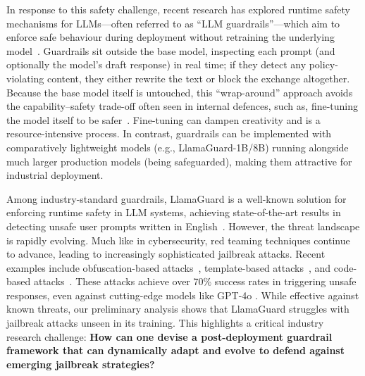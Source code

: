In response to this safety challenge, recent research has explored runtime safety mechanisms for LLMs—often referred to as ``LLM guardrails''—which aim to enforce safe behaviour during deployment without retraining the underlying model~\cite{inan2023llama,lees2022new,markov2023holistic,alon2023detecting}.
Guardrails sit outside the base model, inspecting each prompt (and optionally the model's draft response) in real time; if they detect any policy-violating content, they either rewrite the text or block the exchange altogether. Because the base model itself is untouched, this ``wrap-around'' approach avoids the capability–safety trade-off often seen in internal defences, such as, fine-tuning the model itself to be safer~\cite{zhao2025improving,du2025advancing,alami2024alignment,ge2023mart}. Fine-tuning can dampen creativity and is a resource-intensive process. In contrast, guardrails can be implemented with comparatively lightweight models (e.g., LlamaGuard-1B/8B) running alongside much larger production models (being safeguarded), making them attractive for industrial deployment.


Among industry-standard guardrails, LlamaGuard is a well-known solution for enforcing runtime safety in LLM systems, achieving state-of-the-art results in detecting unsafe user prompts written in English~\cite{inan2023llama}. However, the threat landscape is rapidly evolving. Much like in cybersecurity, red teaming techniques continue to advance, leading to increasingly sophisticated jailbreak attacks. Recent examples include obfuscation-based attacks~\cite{yuan2023gpt,yong2023low}, template-based attacks~\cite{jailbreakchat2023,shen2023anything,yuan2023gpt,li2023deepinception}, and code-based attacks~\cite{lv2024codechameleon,kang2024exploiting}. 
These attacks achieve over 70\% success rates in triggering unsafe responses, even against cutting-edge models like GPT-4o \cite{yuan2023gpt,li2023deepinception}.
While effective against known threats, our preliminary analysis shows that LlamaGuard struggles with jailbreak attacks unseen in its training.
This highlights a critical industry research challenge: \textbf{How can one devise a post-deployment guardrail framework that can dynamically adapt and evolve to defend against emerging jailbreak strategies?}

